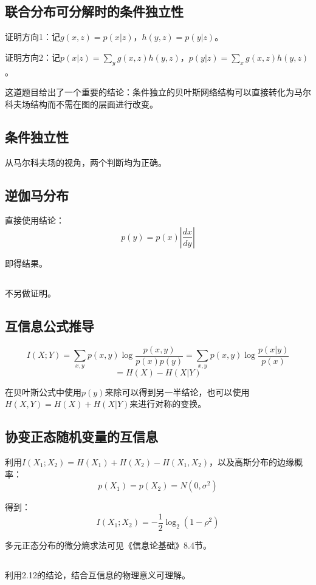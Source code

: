 \documentclass[UTF8]{ctexart}
\begin{document}
\subsection{联合分布可分解时的条件独立性}
证明方向1：记$g(x,z)=p(x|z)$，$h(y,z)=p(y|z)$。

证明方向2：记$p(x|z)=\sum_{y}g(x,z)h(y,z)$，$p(y|z)=\sum_{x}g(x,z)h(y,z)$。

这道题目给出了一个重要的结论：条件独立的贝叶斯网络结构可以直接转化为马尔科夫场结构而不需在图的层面进行改变。

\subsection{条件独立性}
从马尔科夫场的视角，两个判断均为正确。

\subsection{逆伽马分布}
直接使用结论：
$$p(y)=p(x)|\frac{dx}{dy}|$$

即得结果。

\subsection{}
不另做证明。

\subsection{互信息公式推导}
$$I(X;Y)=\sum_{x,y}p(x,y) \log \frac{p(x,y)}{p(x)p(y)}=\sum_{x,y}p(x,y)\log \frac{p(x|y)}{p(x)}$$
$$=H(X)-H(X|Y)$$

在贝叶斯公式中使用$p(y)$来除可以得到另一半结论，也可以使用$H(X,Y)=H(X)+H(X|Y)$来进行对称的变换。

\subsection{协变正态随机变量的互信息}
利用$I(X_{1};X_{2})=H(X_{1})+H(X_{2})-H(X_{1},X_{2})$，以及高斯分布的边缘概率：
$$p(X_{1})=p(X_{2})=N(0,\sigma^{2})$$

得到：
$$I(X_{1};X_{2})=-\frac{1}{2}\log_{2}(1-\rho^{2})$$

多元正态分布的微分熵求法可见《信息论基础》8.4节。

\subsection{}
利用2.12的结论，结合互信息的物理意义可理解。
\end{document}
